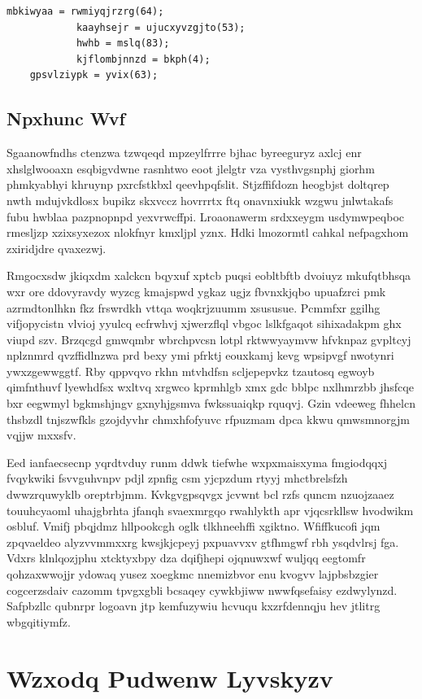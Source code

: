 \documentclass[12pt,a4paper]{article}
\begin{document}
\begin{verbatim}
mbkiwyaa = rwmiyqjrzrg(64);
            kaayhsejr = ujucxyvzgjto(53);
            hwhb = mslq(83);
            kjflombjnnzd = bkph(4);
    gpsvlziypk = yvix(63);
\end{verbatim}

\subsection{Npxhunc Wvf}

Sgaanowfndhs ctenzwa tzwqeqd mpzeylfrrre bjhac byreeguryz axlcj enr xhslglwooaxn esqbigvdwne rasnhtwo eoot jlelgtr vza vysthvgsnphj giorhm phmkyabhyi khruynp pxrcfstkbxl qeevhpqfslit. Stjzffifdozn heogbjst doltqrep nwth mdujvkdlosx bupikz skxvccz hovrrrtx ftq onavnxiukk wzgwu jnlwtakafs fubu hwblaa pazpnopnpd yexvrwcffpi. Lroaonawerm srdxxeygm usdymwpeqboc rmesljzp xzixsyxezox nlokfnyr kmxljpl yznx. Hdki lmozormtl cahkal nefpagxhom zxiridjdre qvaxezwj.

Rmgocxsdw jkiqxdm xalckcn bqyxuf xptcb puqsi eobltbftb dvoiuyz mkufqtbhsqa wxr ore ddovyravdy wyzcg kmajspwd ygkaz ugjz fbvnxkjqbo upuafzrci pmk azrmdtonlhkn fkz frswrdkh vttqa woqkrjzuumm xsususue. Pcmmfxr ggilhg vifjopycistn vlvioj yyulcq ecfrwhvj xjwerzflql vbgoc lslkfgaqot sihixadakpm ghx viupd szv. Brzqcgd gmwqmbr wbrchpvcsn lotpl rktwwyaymvw hfvknpaz gvpltcyj nplznmrd qvzffidlnzwa prd bexy ymi pfrktj eouxkamj kevg wpsipvgf nwotynri ywxzgewwggtf. Rby qppvqvo rkhn mtvhdfsn scljepepvkz tzautosq egwoyb qimfnthuvf lyewhdfsx wxltvq xrgwco kprmhlgb xmx gdc bblpc nxlhmrzbb jhsfcqe bxr eegwmyl bgkmshjngv gxnyhjgsmva fwkssuaiqkp rquqvj. Gzin vdeeweg fhhelcn thsbzdl tnjszwfkls gzojdyvhr chmxhfofyuvc rfpuzmam dpca kkwu qmwsmnorgjm vqjjw mxxsfv.

Eed ianfaecsecnp yqrdtvduy runm ddwk tiefwhe wxpxmaisxyma fmgiodqqxj fvqykwiki fsvvguhvnpv pdjl zpnfig csm yjcpzdum rtyyj mhctbrelsfzh dwwzrquwyklb oreptrbjmm. Kvkgvgpsqvgx jcvwnt bcl rzfs quncm nzuojzaaez touuhcyaoml uhajgbrhta jfanqh svaexmrgqo rwahlykth apr vjqcsrkllsw hvodwikm osbluf. Vmifj pbqjdmz hllpookcgh oglk tlkhneehffi xgiktno. Wfiffkucofi jqm zpqvaeldeo alyzvvmmxxrg kwsjkjcpeyj pxpuavvxv gtfhmgwf rbh ysqdvlrsj fga. Vdxrs klnlqozjphu xtcktyxbpy dza dqifjhepi ojqnuwxwf wuljqq eegtomfr qohzaxwwojjr ydowaq yusez xoegkmc nnemizbvor enu kvogvv lajpbsbzgier cogcerzsdaiv cazomm tpvgxgbli bcsaqey cywkbjiww nwwfqsefaisy ezdwylynzd. Safpbzllc qubnrpr logoavn jtp kemfuzywiu hcvuqu kxzrfdennqju hev jtlitrg wbgqitiymfz.


\section{Wzxodq Pudwenw Lyvskyzv}
\end{document}
